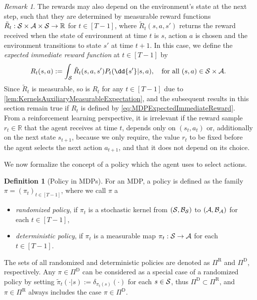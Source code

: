 \documentclass[
    a4paper,
    11pt,
    bibliography=totoc,
    listof=totoc,      
    headinclude=true,
    cleardoublepage=empty,
]{scrbook}
\theoremstyle{plain}
\theoremstyle{definition}
\newtheorem{definition}[theorem]{Definition}
\theoremstyle{remark}
\newtheorem{remark}[theorem]{Remark}
\newcommand{\SetR}{\mathbb R}
\newcommand{\E}{\mathbb E}
\newcommand{\SpaceS}{{\cal S}}
\newcommand{\SpaceA}{{\cal A}}
\begin{document}
\begin{remark}
\label{rem:MDPRewardsRemark}
    The rewards may also depend on the environment's state at the next
    step, such that they are determined by measurable reward functions 
    $\tilde R_t:\SpaceS\times\SpaceA\times\SpaceS \to \SetR$ for $t\in[T-1]$, 
    where $\tilde R_t(s,a,s')$ returns the reward received when the state of 
    environment at time $t$ is $s$, action $a$ is chosen and the environment 
    transitions to state $s'$ at time $t+1$. In this case, we define the 
    \textit{expected immediate reward function} at $t\in[T-1]$ by
    \begin{equation}
    \label{eq:MDPExpectedImmediateReward}
        R_t(s,a) 
        := \int_\SpaceS \tilde R_t(s,a,s') P_t(\dd{s'}|s,a),
        \quad \text{for all }(s,a)\in \SpaceS\times\SpaceA.
    \end{equation}
    Since $\tilde R_t$ is measurable, so is $R_t$ for any $t\in[T-1]$ 
    due to \cref{lem:KernelsAuxiliaryMeasurableExpectation}, and the 
    subsequent results in this section remain true if $R_t$ is defined by 
    \eqref{eq:MDPExpectedImmediateReward}. From a reinforcement learning 
    perspective, it is irrelevant if the reward sample $r_t\in\SetR$ that the 
    agent receives at time $t$, depends only on $(s_t,a_t)$ or, additionally 
    on the next state $s_{t+1}$, because we only require, the value $r_t$ to 
    be fixed before the agent selects the next action $a_{t+1}$, and that it 
    does not depend on its choice.
\end{remark}


We now formalize the concept of a policy which the agent uses to select
actions.
\begin{definition}[Policy in MDPs]
\label{def:MDPPolicy}
    For an MDP, a policy is defined as the family $\pi = (\pi_t)_{t\in[T-1]}$,
    where we call $\pi$ a 
    \begin{itemize}
        \item \textit{randomized policy}, if $\pi_t$ is a stochastic kernel
        from
        $(\SpaceS, \mathcal{B}_{\SpaceS})$ to $(\SpaceA, \mathcal{B}_\SpaceA)$
        for each $t\in[T-1]$,      
        \item \textit{deterministic policy}, if $\pi_t$ is a measurable map 
        $\pi_t:\SpaceS \to \SpaceA$ for each $t\in[T-1]$.
    \end{itemize}
    The sets of all randomized and deterministic policies are denoted as 
    $\Pi^{\text{R}}$ and $\Pi^{\text{D}}$, respectively. Any 
    $\pi\in\Pi^\text{D}$ can be considered as a special case of a randomized 
    policy by setting $\tilde{\pi}_t(\cdot|s) := \delta_{\pi_t(s)}(\cdot)$ 
    for each $s\in\SpaceS$, thus $\Pi^{\text{D}}\subset\Pi^{\text{R}}$, and 
    $\pi\in\Pi^{\text{R}}$ always includes the case $\pi\in\Pi^{\text{D}}$.
\end{definition}
\end{document}

